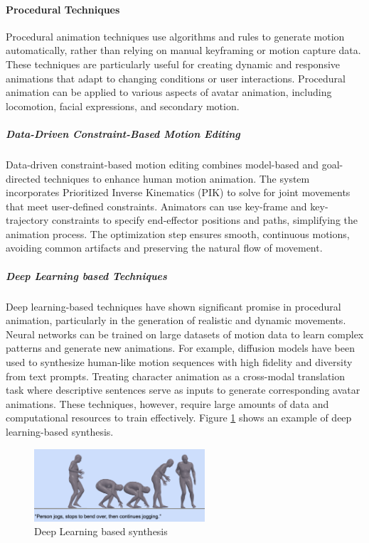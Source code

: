 \documentclass[../../main.tex]{subfiles}
\begin{document}
\paragraph{Procedural Techniques}
\label{par:procedural_techniques}

Procedural animation techniques use algorithms and rules to generate motion automatically, rather than relying on manual keyframing or motion capture data. These techniques are particularly useful for creating dynamic and responsive animations that adapt to changing conditions or user interactions. Procedural animation can be applied to various aspects of avatar animation, including locomotion, facial expressions, and secondary motion.

\subparagraph{Data-Driven Constraint-Based Motion Editing}
\label{subpar:data_driven_constraint_based_motion_editing}

Data-driven constraint-based motion editing\cite{inbook} combines model-based and goal-directed techniques to enhance human motion animation. The system incorporates Prioritized Inverse Kinematics (PIK) to solve for joint movements that meet user-defined constraints. Animators can use key-frame and key-trajectory constraints to specify end-effector positions and paths, simplifying the animation process. The optimization step ensures smooth, continuous motions, avoiding common artifacts and preserving the natural flow of movement.

\subparagraph{Deep Learning based Techniques}
\label{subpar:deep_learning_based_techniques}

Deep learning-based techniques have shown significant promise in procedural animation, particularly in the generation of realistic and dynamic movements. Neural networks can be trained on large datasets of motion data to learn complex patterns and generate new animations. For example, diffusion models have been used to synthesize human-like motion sequences with high fidelity and diversity from text prompts. Treating character animation as a cross-modal translation task where descriptive sentences serve as inputs to generate corresponding avatar animations. These techniques, however, require large amounts of data and computational resources to train effectively. Figure \ref{fig:deep_learning_synthesis} shows an example of deep learning-based synthesis.

\begin{figure} 
  \centering \includegraphics[width = 2.5in]{chapters/background_work/images/deep_learning_synthesis.png} 
  \caption{Deep Learning based synthesis} 
  \label{fig:deep_learning_synthesis} 
\end{figure}
\end{document}
